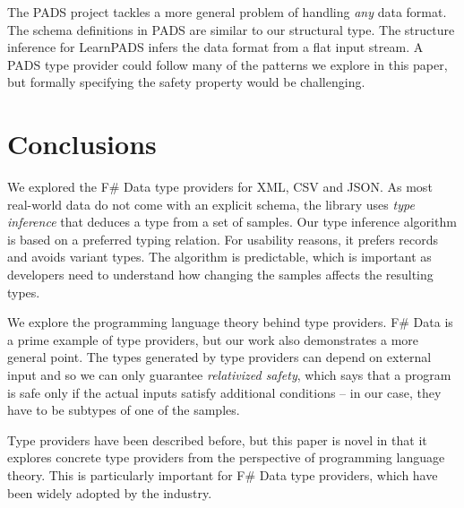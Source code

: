 \documentclass[10pt,preprint,blind,clearpagebib]{sigplanconf}
\begin{document}
The PADS project \cite{pads-dsl,pads-ml} tackles a more general problem of handling \emph{any} data format.
The schema definitions in PADS are similar to our structural type. The structure inference for LearnPADS
\cite{pads-learn} infers the data format from a flat input stream. A PADS type provider could follow
many of the patterns we explore in this paper, but formally specifying the safety property would be
challenging.

\section{Conclusions}
\label{sec:conclusions}

We explored the F\# Data type providers for XML, CSV and JSON. As most real-world data do not come 
with an explicit schema, the library uses \emph{type inference} that deduces a type from a set of 
samples. Our type inference algorithm is based on a preferred typing relation. For usability 
reasons, it prefers records and avoids variant types. The algorithm is predictable, which is 
important as developers need to understand how changing the samples affects the resulting types.

We explore the programming language theory behind type providers. F\# Data is a prime example of 
type providers, but our work also demonstrates a more general point. The types generated by type 
providers can depend on external input and so we can only guarantee \emph{relativized safety}, 
which says that a program is safe only if the actual inputs satisfy additional conditions --
in our case, they have to be subtypes of one of the samples.

Type providers have been described before, but this paper is novel in that it explores concrete 
type providers from the perspective of programming language theory. This is particularly important
for F\# Data type providers, which have been widely adopted by the industry.




\end{document}
